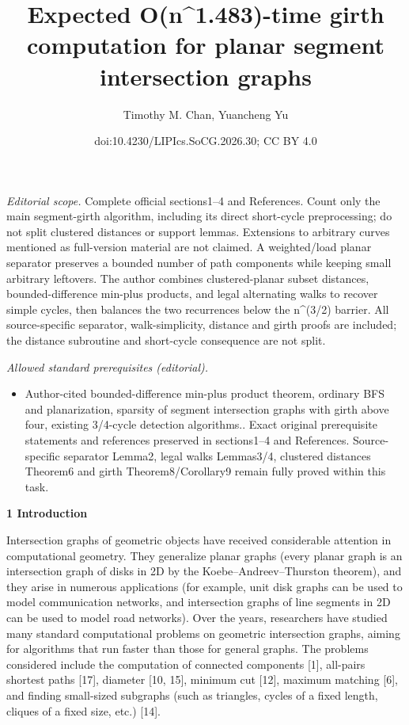 \documentclass[10pt,a4paper]{article}
\title{Expected O(n\textasciicircum{}1.483)-time girth computation for planar segment intersection graphs}
\author{Timothy M. Chan, Yuancheng Yu}
\date{doi:10.4230/LIPIcs.SoCG.2026.30; CC BY 4.0}
\begin{document}
\maketitle
\noindent\textit{Editorial scope.} Complete official sections1–4 and References. Count only the main segment-girth algorithm, including its direct short-cycle preprocessing; do not split clustered distances or support lemmas. Extensions to arbitrary curves mentioned as full-version material are not claimed. A weighted/load planar separator preserves a bounded number of path components while keeping small arbitrary leftovers. The author combines clustered-planar subset distances, bounded-difference min-plus products, and legal alternating walks to recover simple cycles, then balances the two recurrences below the n\textasciicircum{}(3/2) barrier. All source-specific separator, walk-simplicity, distance and girth proofs are included; the distance subroutine and short-cycle consequence are not split.\par\medskip
\noindent\textit{Allowed standard prerequisites (editorial).}\begin{itemize}
\item Author-cited bounded-difference min-plus product theorem, ordinary BFS and planarization, sparsity of segment intersection graphs with girth above four, existing 3/4-cycle detection algorithms.. Exact original prerequisite statements and references preserved in sections1–4 and References. Source-specific separator Lemma2, legal walks Lemmas3/4, clustered distances Theorem6 and girth Theorem8/Corollary9 remain fully proved within this task.
\end{itemize}\medskip
\par\medskip\noindent\textbf{1 Introduction}\par
Intersection graphs of geometric objects have received considerable attention in computational geometry. They generalize planar graphs (every planar graph is an intersection graph of disks in 2D by the Koebe–Andreev–Thurston theorem), and they arise in numerous applications (for example, unit disk graphs can be used to model communication networks, and intersection graphs of line segments in 2D can be used to model road networks). Over the years, researchers have studied many standard computational problems on geometric intersection graphs, aiming for algorithms that run faster than those for general graphs. The problems considered include the computation of connected components [1], all-pairs shortest paths [17], diameter [10, 15], minimum cut [12], maximum matching [6], and finding small-sized subgraphs (such as triangles, cycles of a fixed length, cliques of a fixed size, etc.) [14].
\end{document}
